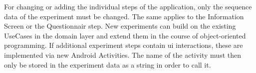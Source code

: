 For changing or adding the individual steps of the application, only the sequence data of the experiment must be changed. The same applies to the Information Screen or the Questionnair step. New experiments can build on the existing UseCases in the domain layer and extend them in the course of object-oriented programming. If additional experiment steps contain \ac{ui} interactions, these are implemented via new Android Activities. The name of the activity must then only be stored in the experiment data as a string in order to call it.